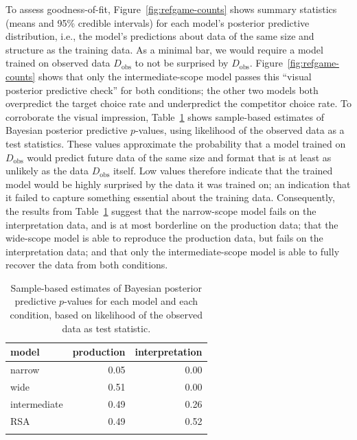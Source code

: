 \documentclass{article}
\begin{document}
To assess goodness-of-fit, Figure~\ref{fig:refgame-counts} shows summary statistics (means and 95\% credible intervals) for each model's posterior predictive distribution, i.e., the model's predictions about data of the same size and structure as the training data.
As a minimal bar, we would require a model trained on observed data $D_{\text{obs}}$ to not be surprised by $D_{\text{obs}}$.
Figure~\ref{fig:refgame-counts} shows that only the intermediate-scope model passes this ``visual posterior predictive check'' for both conditions; the other two models both overpredict the target choice rate and underpredict the competitor choice rate.
To corroborate the visual impression, Table~\ref{tab:Bppp-values} shows sample-based estimates of Bayesian posterior predictive $p$-values, using likelihood of the observed data as a test statistics.
These values approximate the probability that a model trained on $D_{\text{obs}}$ would predict future data of the same size and format that is at least as unlikely as the data $D_{\text{obs}}$ itself.
Low values therefore indicate that the trained model would be highly surprised by the data it was trained on; an indication that it failed to capture something essential about the training data.
Consequently, the results from Table~\ref{tab:Bppp-values} suggest that the narrow-scope model fails on the interpretation data, and is at most borderline on the production data; that the wide-scope model is able to reproduce the production data, but fails on the interpretation data; and that only the intermediate-scope model is able to fully recover the data from both conditions.

\begin{table}[ht]
\centering

\begin{tabular}{lrr}
  \toprule
  model        & production & interpretation \\ \midrule
  narrow       & 0.05       & 0.00 \\
  wide         & 0.51       & 0.00 \\
  intermediate & 0.49       & 0.26 \\
  RSA          & 0.49       & 0.52 \\
  \bottomrule \\
\end{tabular}

\caption{Sample-based estimates of Bayesian posterior predictive $p$-values for each model and each condition, based on likelihood of the observed data as test statistic.}
\label{tab:Bppp-values}
\end{table}
\end{document}
